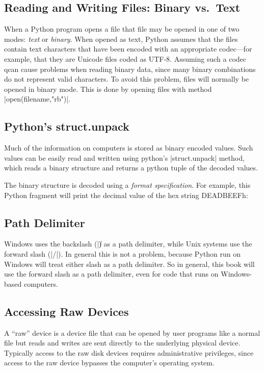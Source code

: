 \subsection{Reading and Writing Files: Binary vs.\ Text}

When a Python program opens a file that file may be opened in one of
two modes: \emph{text} or \emph{binary}.  When opened as text, Python
assumes that the files contain text characters that have been encoded
with an appropriate codec---for example, that they are Unicode files
coded as UTF-8. Assuming such a codec qcan cause problems when reading
binary data, since many binary combinations do not represent valid
characters. To avoid this problem, files will normally be opened in
binary mode. This is done by opening files with method
|open(filename,"rb")|.

\subsection{Python's struct.unpack}
Much of the information on computers is stored as binary encoded
values. Such values can be easily read and written using python's
|struct.unpack| method, which reads a binary structure and returns a
python tuple of the decoded values.  

The binary structure is decoded using a \emph{format
  specification}. For example, this Python fragment will print the
decimal value of the hex string DEADBEEFh:




\subsection{Path Delimiter}
Windows uses the backslash (|\|) as a path delimiter, while Unix
systems use the forward slash (|/|). In general this is not a problem,
because Python run on Windows will treat either slash as a path
delimiter. So in general, this book will use the forward slash as a
path delimiter, even for code that runs on Windows-based computers.

\subsection{Accessing Raw Devices}

A ``raw'' device is a device file that can be opened by user programs
like a normal file but reads and writes are sent directly to the
underlying physical device. Typically access to the raw disk devices 
requires administrative privileges, since access to the raw device
bypasses the computer's operating system.

